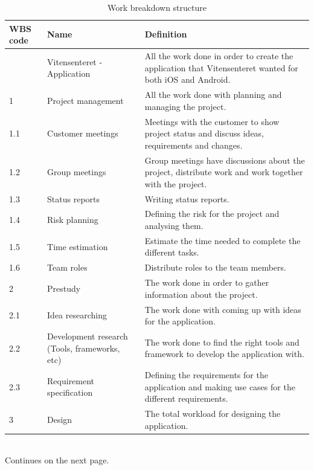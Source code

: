 \begin{center}
\begin{table}[H]
\caption{Work breakdown structure}
\begin{tabular}{| m{2cm} | m{5cm} | m{5cm} |}
\hline
\textbf {WBS code} & \textbf {Name} & \textbf{Definition} \\
\hline
     & Vitensenteret - Application & All the work done in order to create the application that Vitensenteret wanted for both iOS and Android.   \\
    \hline
    1 & Project management & All the work done with planning and managing the project. \\ 
    \hline
    1.1 & Customer meetings & Meetings with the customer to show project status and discuss ideas, requirements and changes. \\
    \hline
    1.2 & Group meetings & Group meetings have discussions about the project, distribute work and work together with the project.\\
    \hline
    1.3 & Status reports & Writing status reports. \\
    \hline
    1.4 & Risk planning & Defining the risk for the project and analysing them. \\
    \hline
    1.5 & Time estimation & Estimate the time needed to complete the different tasks. \\
    \hline
    1.6 & Team roles & Distribute roles to the team members. \\
    \hline
    2 & Prestudy & The work done in order to gather information about the project. \\
    \hline
    2.1 & Idea researching & The work done with coming up with ideas for the application. \\
    \hline
    2.2 & Development research (Tools, frameworks, etc) & The work done to find the right tools and framework to develop the application with. \\
    \hline
    2.3 & Requirement specification & Defining the requirements for the application and making use cases for the different requirements. \\
    \hline
    3 & Design & The total workload for designing the application. \\
    \hline
\end{tabular}\\
Continues on the next page.
\end{table}
\end{center}
